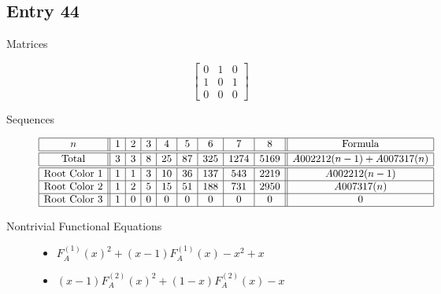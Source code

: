 \documentclass[12pt]{amsart}
\newcommand{\gff}[2]{F_{#2}^{(#1)}(x)}
\newcommand{\gfa}[1]{\gff{#1}{A}}
\begin{document}
\subsection*{Entry 44}
\begin{description}
    \item[Matrices]
    
    \[\begin{bmatrix}
0 & 1 & 0 \\
1 & 0 & 1 \\
0 & 0 & 0
\end{bmatrix}\]
    \item[Sequences]\hspace*{\fill}\vspace{-0.5cm}
    \begin{center}
        \[
        \begin{array}{|c||c|c|c|c|c|c|c|c||c|}\hline
           n  & 1 & 2 & 3 & 4 & 5 & 6 & 7 & 8  & \text{Formula}\\\hline\hline
           \text{Total}  & 3 & 3 & 8 & 25 & 87 & 325 & 1274 & 5169 & A002212(n - 1) + A007317(n)\\\hline\hline
           \text{Root Color }1 & 1 & 1 & 3 & 10 & 36 & 137 & 543 & 2219 & A002212(n-1)\\\hline
           \text{Root Color }2 & 1 & 2 & 5 & 15 & 51 & 188 & 731 & 2950 & A007317(n)\\\hline
           \text{Root Color }3 & 1 & 0 & 0 & 0 & 0 & 0 & 0 & 0 & 0\\\hline
        \end{array}
        \]
    \end{center}
    
    \item[Nontrivial Functional Equations]\hspace*{\fill}

    \begin{itemize}
\item $\gfa{1}^2+(x - 1)\gfa{1}-x^2 + x$


\item $(x - 1)\gfa{2}^2+(1 - x)\gfa{2}-x$



\end{itemize}
\end{description}
\end{document}
